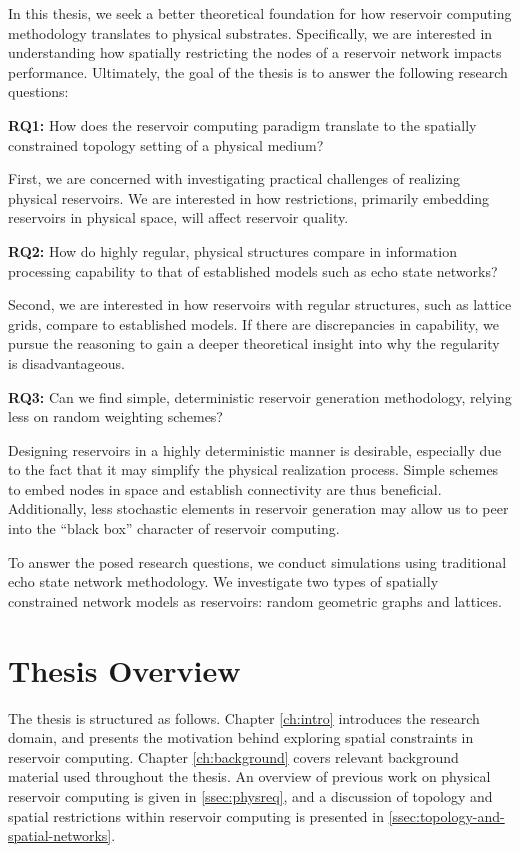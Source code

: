 In this thesis, we seek a better theoretical foundation for how reservoir
computing methodology translates to physical substrates. Specifically, we are
interested in understanding how spatially restricting the nodes of a reservoir
network impacts performance. Ultimately, the goal of the thesis is to answer the
following research questions:

\textbf{RQ1:} How does the reservoir computing paradigm translate to the
spatially constrained topology setting of a physical medium?

First, we are concerned with investigating practical challenges of realizing
physical reservoirs. We are interested in how restrictions, primarily embedding
reservoirs in physical space, will affect reservoir quality.

\textbf{RQ2:} How do highly regular, physical structures compare in information
processing capability to that of established models such as echo state networks?

Second, we are interested in how reservoirs with regular structures, such as
lattice grids, compare to established models. If there are discrepancies in
capability, we pursue the reasoning to gain a deeper theoretical insight into
why the regularity is disadvantageous.

\textbf{RQ3:} Can we find simple, deterministic reservoir generation
methodology, relying less on random weighting schemes?

Designing reservoirs in a highly deterministic manner is desirable, especially
due to the fact that it may simplify the physical realization process. Simple
schemes to embed nodes in space and establish connectivity are thus
beneficial. Additionally, less stochastic elements in reservoir generation may
allow us to peer into the ``black box'' character of reservoir computing.

To answer the posed research questions, we conduct simulations using traditional
echo state network methodology. We investigate two types of spatially
constrained network models as reservoirs: random geometric graphs and lattices.

\section{Thesis Overview}

The thesis is structured as follows. Chapter \ref{ch:intro} introduces the
research domain, and presents the motivation behind exploring spatial
constraints in reservoir computing. Chapter \ref{ch:background} covers relevant
background material used throughout the thesis. An overview of previous work on
physical reservoir computing is given in \ref{ssec:physreq}, and a discussion of
topology and spatial restrictions within reservoir computing is presented in
\ref{ssec:topology-and-spatial-networks}.

